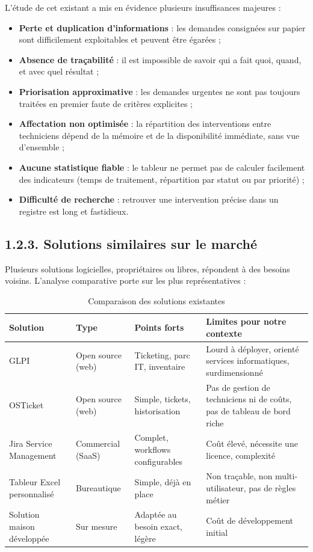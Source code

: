 \documentclass[11pt,a4paper]{report}
\begin{document}
L'étude de cet existant a mis en évidence plusieurs insuffisances majeures :
\begin{itemize}
  \item \textbf{Perte et duplication d'informations} : les demandes consignées sur papier sont difficilement exploitables et peuvent être égarées ;
  \item \textbf{Absence de traçabilité} : il est impossible de savoir qui a fait quoi, quand, et avec quel résultat ;
  \item \textbf{Priorisation approximative} : les demandes urgentes ne sont pas toujours traitées en premier faute de critères explicites ;
  \item \textbf{Affectation non optimisée} : la répartition des interventions entre techniciens dépend de la mémoire et de la disponibilité immédiate, sans vue d'ensemble ;
  \item \textbf{Aucune statistique fiable} : le tableur ne permet pas de calculer facilement des indicateurs (temps de traitement, répartition par statut ou par priorité) ;
  \item \textbf{Difficulté de recherche} : retrouver une intervention précise dans un registre est long et fastidieux.
\end{itemize}
\subsection*{1.2.3. Solutions similaires sur le marché}

Plusieurs solutions logicielles, propriétaires ou libres, répondent à des besoins voisins. L'analyse comparative porte sur les plus représentatives :
\begin{table}[htbp]\centering\small
\begin{tabularx}{\textwidth}{|X|X|X|X|}
\hline\rowcolor{hdr}\textbf{Solution} & \textbf{Type} & \textbf{Points forts} & \textbf{Limites pour notre contexte}\\ \hline
GLPI & Open source (web) & Ticketing, parc IT, inventaire & Lourd à déployer, orienté services informatiques, surdimensionné\\ \hline
OSTicket & Open source (web) & Simple, tickets, historisation & Pas de gestion de techniciens ni de coûts, pas de tableau de bord riche\\ \hline
Jira Service Management & Commercial (SaaS) & Complet, workflows configurables & Coût élevé, nécessite une licence, complexité\\ \hline
Tableur Excel personnalisé & Bureautique & Simple, déjà en place & Non traçable, non multi-utilisateur, pas de règles métier\\ \hline
Solution maison développée & Sur mesure & Adaptée au besoin exact, légère & Coût de développement initial\\ \hline
\end{tabularx}
\caption{Comparaison des solutions existantes}
\end{table}
\end{document}

